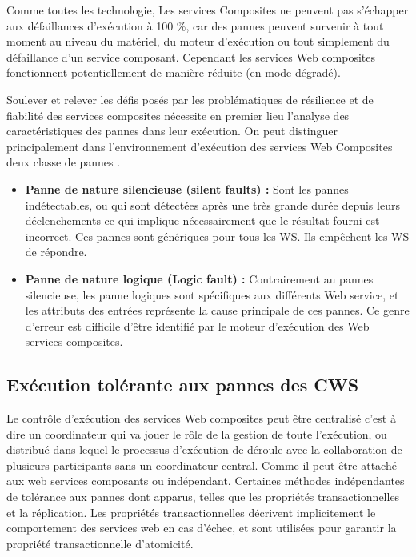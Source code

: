 Comme toutes les technologie, Les services Composites ne peuvent pas s’échapper aux défaillances d’exécution à 100 \%, car des pannes peuvent survenir à tout moment au niveau du matériel, du moteur d’exécution ou tout simplement du défaillance d’un service composant.
Cependant les services Web composites fonctionnent potentiellement de manière réduite (en mode dégradé).

Soulever et relever les défis posés par les problématiques de résilience et de fiabilité des services composites nécessite en premier lieu l’analyse des caractéristiques des pannes dans leur exécution.
On peut distinguer principalement dans l’environnement d’exécution des services Web Composites deux classe de pannes \cite{2}. 
\begin{itemize}
    \item \textbf{Panne de nature silencieuse (silent faults) :} Sont les pannes indétectables, ou qui sont détectées après une très grande durée depuis leurs déclenchements ce qui implique nécessairement que le résultat fourni est incorrect. 
    Ces pannes sont génériques pour tous les WS. Ils empêchent les WS de répondre.
    \item \textbf{ Panne de nature logique (Logic fault) :} Contrairement au pannes silencieuse, les panne logiques sont spécifiques aux différents Web service, et les attributs des entrées représente la cause principale de ces pannes.
    Ce genre d’erreur est difficile d’être identifié par le moteur d’exécution des Web services composites.
\end{itemize}

\subsection{Exécution tolérante aux pannes des CWS}

Le contrôle d'exécution des services Web composites peut être centralisé c’est à dire un coordinateur qui va jouer le rôle de la gestion de toute l’exécution,  ou distribué dans lequel le processus d’exécution de déroule avec la collaboration de plusieurs participants sans un coordinateur central. Comme il peut être attaché aux web services composants ou indépendant.
Certaines méthodes indépendantes de tolérance aux pannes dont apparus, telles que les propriétés transactionnelles et la réplication. Les propriétés transactionnelles décrivent implicitement le comportement des services web en cas d'échec, et sont utilisées pour garantir la propriété transactionnelle d’atomicité.

